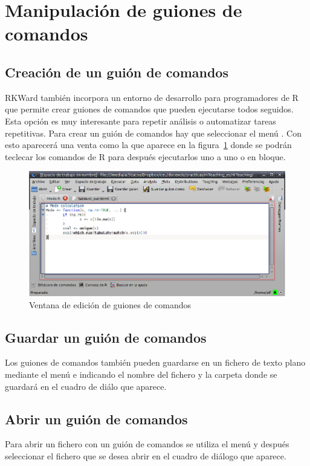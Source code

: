 \section{Manipulación de guiones de comandos}

\subsection{Creación de un guión de comandos}
RKWard también incorpora un entorno de desarrollo para programadores de R que permite crear guiones de comandos que
pueden ejecutarse todos seguidos.
Esta opción es muy interesante para repetir análisis o automatizar tareas repetitivas.
Para crear un guión de comandos hay que seleccionar el menú .
Con esto aparecerá una venta como la que aparece en la figura~\ref{g:guiones_comandos} donde se podrán teclecar los
comandos de R para después ejecutarlos uno a uno o en bloque.

\begin{figure}[htp]
\begin{center}
  \includegraphics[scale=0.6]{capitulos/introduccion/img/guiones_comandos}
  \caption{Ventana de edición de guiones de comandos}
  \label{g:guiones_comandos}
\end{center}
\end{figure}


\subsection{Guardar un guión de comandos}
Los guiones de comandos también pueden guardarse en un fichero de texto plano mediante el menú
 e indicando el nombre del fichero y la carpeta donde se guardará en el
cuadro de diálo que aparece.


\subsection{Abrir un guión de comandos}
Para abrir un fichero con un guión de comandos se utiliza el menú  y
después seleccionar el fichero que se desea abrir en el cuadro de diálogo que aparece. 


